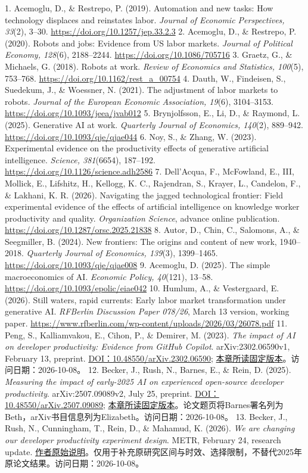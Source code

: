 \documentclass[UTF8,fontset=windows,12pt,a4paper,oneside,openany]{ctexbook}
\begin{document}
1. Acemoglu, D., \& Restrepo, P. (2019). Automation and new tasks: How technology displaces and reinstates labor. \emph{Journal of Economic Perspectives, 33}(2), 3–30. \url{https://doi.org/10.1257/jep.33.2.3}
2. Acemoglu, D., \& Restrepo, P. (2020). Robots and jobs: Evidence from US labor markets. \emph{Journal of Political Economy, 128}(6), 2188–2244. \url{https://doi.org/10.1086/705716}
3. Graetz, G., \& Michaels, G. (2018). Robots at work. \emph{Review of Economics and Statistics, 100}(5), 753–768. \url{https://doi.org/10.1162/rest_a_00754}
4. Dauth, W., Findeisen, S., Suedekum, J., \& Woessner, N. (2021). The adjustment of labor markets to robots. \emph{Journal of the European Economic Association, 19}(6), 3104–3153. \url{https://doi.org/10.1093/jeea/jvab012}
5. Brynjolfsson, E., Li, D., \& Raymond, L. (2025). Generative AI at work. \emph{Quarterly Journal of Economics, 140}(2), 889–942. \url{https://doi.org/10.1093/qje/qjae044}
6. Noy, S., \& Zhang, W. (2023). Experimental evidence on the productivity effects of generative artificial intelligence. \emph{Science, 381}(6654), 187–192. \url{https://doi.org/10.1126/science.adh2586}
7. Dell’Acqua, F., McFowland, E., III, Mollick, E., Lifshitz, H., Kellogg, K. C., Rajendran, S., Krayer, L., Candelon, F., \& Lakhani, K. R. (2026). Navigating the jagged technological frontier: Field experimental evidence of the effects of artificial intelligence on knowledge worker productivity and quality. \emph{Organization Science}, advance online publication. \url{https://doi.org/10.1287/orsc.2025.21838}
8. Autor, D., Chin, C., Salomons, A., \& Seegmiller, B. (2024). New frontiers: The origins and content of new work, 1940–2018. \emph{Quarterly Journal of Economics, 139}(3), 1399–1465. \url{https://doi.org/10.1093/qje/qjae008}
9. Acemoglu, D. (2025). The simple macroeconomics of AI. \emph{Economic Policy, 40}(121), 13–58. \url{https://doi.org/10.1093/epolic/eiae042}
10. Humlum, A., \& Vestergaard, E. (2026). Still waters, rapid currents: Early labor market transformation under generative AI. \emph{RFBerlin Discussion Paper 078/26}, March 13 version, working paper. \url{https://www.rfberlin.com/wp-content/uploads/2026/03/26078.pdf}
11. Peng, S., Kalliamvakou, E., Cihon, P., \& Demirer, M. (2023). \emph{The impact of AI on developer productivity: Evidence from GitHub Copilot}. arXiv:2302.06590v1, February 13, preprint. \href{https://doi.org/10.48550/arXiv.2302.06590}{DOI：10.48550/arXiv.2302.06590}; \href{https://arxiv.org/pdf/2302.06590v1}{本章所读固定版本}。访问日期：2026-10-08。
12. Becker, J., Rush, N., Barnes, E., \& Rein, D. (2025). \emph{Measuring the impact of early-2025 AI on experienced open-source developer productivity}. arXiv:2507.09089v2, July 25, preprint. \href{https://doi.org/10.48550/arXiv.2507.09089}{DOI：10.48550/arXiv.2507.09089}; \href{https://arxiv.org/pdf/2507.09089v2}{本章所读固定版本}。论文题页将Barnes署名列为Beth，arXiv书目信息列为Elizabeth。访问日期：2026-10-08。
13. Becker, J., Rush, N., Cunningham, T., Rein, D., \& Mahamud, K. (2026). \emph{We are changing our developer productivity experiment design}. METR, February 24, research update. \href{https://metr.org/blog/2026-02-24-uplift-update/}{作者原始说明}。仅用于补充原研究区间与时效、选择限制，不替代2025年原论文结果。访问日期：2026-10-08。
\end{document}
